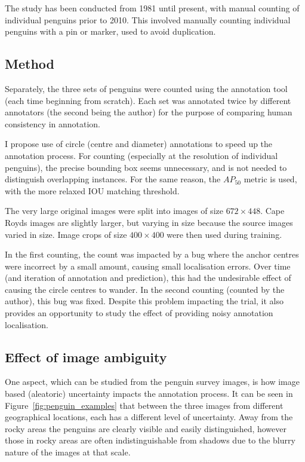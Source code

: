 The study has been conducted from 1981 until present, with manual counting of individual penguins prior to 2010. This involved manually counting individual penguins with a pin or marker, used to avoid duplication. 


\subsection {Method}

Separately, the three sets of penguins were counted using the annotation tool (each time beginning from scratch). Each set was annotated twice by different annotators (the second being the author) for the purpose  of comparing human consistency in annotation.

I propose use of circle (centre and diameter) annotations to speed up the annotation process. For counting (especially at the resolution of individual penguins), the precise bounding box seems unnecessary, and is not needed to distinguish overlapping instances. For the same reason, the $AP_{50}$ metric is used, with the more relaxed \gls{IOU} matching threshold.

The very large original images were split into images of size $ 672\times448 $. Cape Royds images are slightly larger, but varying in size because the source images varied in size. Image crops of size $ 400\times400 $ were then used during training.

In the first counting, the count was impacted by a bug where the anchor centres were incorrect by a small amount, causing small localisation errors. Over time (and iteration of annotation and prediction), this had the undesirable effect of causing the circle centres to wander. In the second counting (counted by the author), this bug was fixed. Despite this problem impacting the trial, it also provides an opportunity to study the effect of providing noisy annotation localisation.

\subsection {Effect of image ambiguity}

One aspect, which can be studied from the penguin survey images, is how image based (aleatoric) uncertainty impacts the annotation process. It can be seen in Figure~\ref{fig:penguin_examples} that between the three images from different geographical locations, each has a different level of uncertainty. Away from the rocky areas the penguins are clearly visible and easily distinguished, however those in rocky areas are often indistinguishable from shadows due to the blurry nature of the images at that scale.

